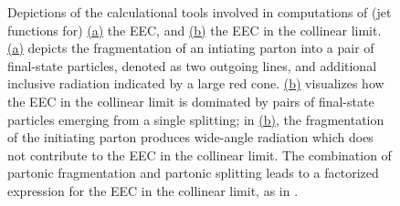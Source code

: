 \begin{figure}[t!]
    \centering
    \hfill

    \caption[Depictions of jet function calculations for the EEC.]{
    Depictions of the calculational tools involved in computations of (jet functions for) \hyperref[fig:shower:cartoon:collinear1]{(a)} the EEC, and \hyperref[fig:shower:cartoon:collinear2]{(b)} the EEC in the collinear limit.
    \hyperref[fig:shower:cartoon:collinear1]{(a)} depicts the fragmentation of an intiating parton into a pair of final-state particles, denoted as two outgoing lines, and additional inclusive radiation indicated by a large red cone.
    \hyperref[fig:shower:cartoon:collinear2]{(b)} visualizes how the EEC in the collinear limit is dominated by pairs of final-state particles emerging from a single splitting;
    in \hyperref[fig:shower:cartoon:collinear2]{(b)}, the fragmentation of the initiating parton produces wide-angle radiation which does not contribute to the EEC in the collinear limit.
    The combination of partonic fragmentation and partonic splitting leads to a factorized expression for the EEC in the collinear limit, as in .
    }
    \label{fig:shower:cartoon:collinear}
\end{figure}

